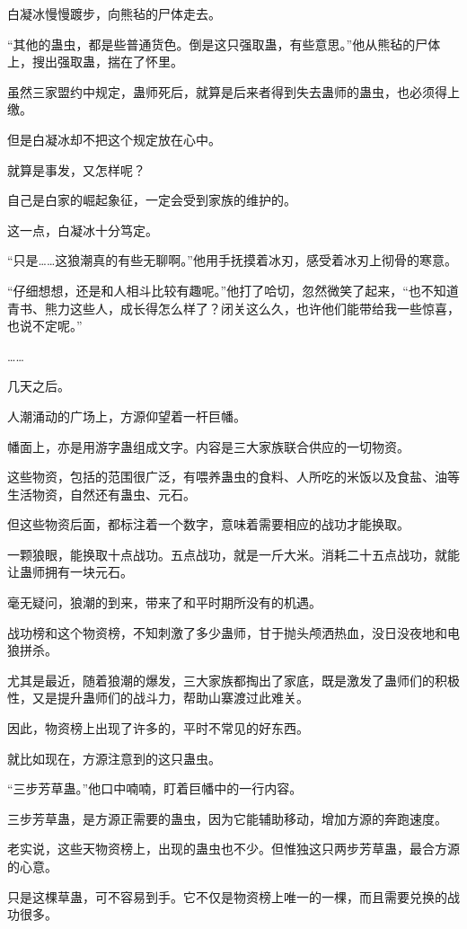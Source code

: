 \begin{this_body}
白凝冰慢慢踱步，向熊毡的尸体走去。

“其他的蛊虫，都是些普通货色。倒是这只强取蛊，有些意思。”他从熊毡的尸体上，搜出强取蛊，揣在了怀里。

虽然三家盟约中规定，蛊师死后，就算是后来者得到失去蛊师的蛊虫，也必须得上缴。

但是白凝冰却不把这个规定放在心中。

就算是事发，又怎样呢？

自己是白家的崛起象征，一定会受到家族的维护的。

这一点，白凝冰十分笃定。

“只是……这狼潮真的有些无聊啊。”他用手抚摸着冰刃，感受着冰刃上彻骨的寒意。

“仔细想想，还是和人相斗比较有趣呢。”他打了哈切，忽然微笑了起来，“也不知道青书、熊力这些人，成长得怎么样了？闭关这么久，也许他们能带给我一些惊喜，也说不定呢。”

……

几天之后。

人潮涌动的广场上，方源仰望着一杆巨幡。

幡面上，亦是用游字蛊组成文字。内容是三大家族联合供应的一切物资。

这些物资，包括的范围很广泛，有喂养蛊虫的食料、人所吃的米饭以及食盐、油等生活物资，自然还有蛊虫、元石。

但这些物资后面，都标注着一个数字，意味着需要相应的战功才能换取。

一颗狼眼，能换取十点战功。五点战功，就是一斤大米。消耗二十五点战功，就能让蛊师拥有一块元石。

毫无疑问，狼潮的到来，带来了和平时期所没有的机遇。

战功榜和这个物资榜，不知刺激了多少蛊师，甘于抛头颅洒热血，没日没夜地和电狼拼杀。

尤其是最近，随着狼潮的爆发，三大家族都掏出了家底，既是激发了蛊师们的积极性，又是提升蛊师们的战斗力，帮助山寨渡过此难关。

因此，物资榜上出现了许多的，平时不常见的好东西。

就比如现在，方源注意到的这只蛊虫。

“三步芳草蛊。”他口中喃喃，盯着巨幡中的一行内容。

三步芳草蛊，是方源正需要的蛊虫，因为它能辅助移动，增加方源的奔跑速度。

老实说，这些天物资榜上，出现的蛊虫也不少。但惟独这只两步芳草蛊，最合方源的心意。

只是这棵草蛊，可不容易到手。它不仅是物资榜上唯一的一棵，而且需要兑换的战功很多。


\end{this_body}
